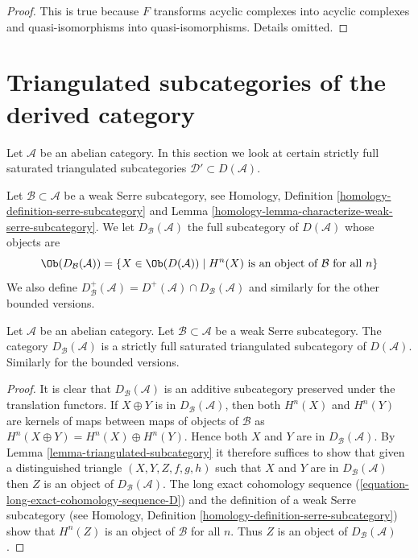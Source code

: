 \begin{proof}
This is true because $F$ transforms acyclic complexes into acyclic complexes
and quasi-isomorphisms into quasi-isomorphisms. Details omitted.
\end{proof}









\section{Triangulated subcategories of the derived category}
\label{section-triangulated-sub}

\noindent
Let $\mathcal{A}$ be an abelian category. In this section we look at
certain strictly full saturated triangulated subcategories
$\mathcal{D}' \subset D(\mathcal{A})$.

\medskip\noindent
Let $\mathcal{B} \subset \mathcal{A}$ be a weak Serre subcategory, see
Homology, Definition \ref{homology-definition-serre-subcategory} and
Lemma \ref{homology-lemma-characterize-weak-serre-subcategory}.
We let $D_\mathcal{B}(\mathcal{A})$ the full subcategory of
$D(\mathcal{A})$ whose objects are
$$
\Ob(D_\mathcal{B}(\mathcal{A}))
=
\{X \in \Ob(D(\mathcal{A})) \mid
H^n(X) \text{ is an object of }\mathcal{B}\text{ for all }n\}
$$
We also define
$D^{+}_\mathcal{B}(\mathcal{A}) =
D^{+}(\mathcal{A}) \cap D_\mathcal{B}(\mathcal{A})$
and similarly for the other bounded versions.

\begin{lemma}
\label{lemma-cohomology-in-serre-subcategory}
Let $\mathcal{A}$ be an abelian category.
Let $\mathcal{B} \subset \mathcal{A}$ be a weak Serre subcategory.
The category $D_\mathcal{B}(\mathcal{A})$ is a strictly full
saturated triangulated subcategory of $D(\mathcal{A})$.
Similarly for the bounded versions.
\end{lemma}

\begin{proof}
It is clear that $D_\mathcal{B}(\mathcal{A})$ is an additive subcategory
preserved under the translation functors.
If $X \oplus Y$ is in $D_\mathcal{B}(\mathcal{A})$, then
both $H^n(X)$ and $H^n(Y)$ are kernels of maps between maps of objects
of $\mathcal{B}$ as $H^n(X \oplus Y) = H^n(X) \oplus H^n(Y)$.
Hence both $X$ and $Y$ are in $D_\mathcal{B}(\mathcal{A})$. By
Lemma \ref{lemma-triangulated-subcategory}
it therefore suffices to show that given a distinguished triangle
$(X, Y, Z, f, g, h)$ such that $X$ and $Y$ are in $D_\mathcal{B}(\mathcal{A})$
then $Z$ is an object of $D_\mathcal{B}(\mathcal{A})$. The long exact
cohomology sequence (\ref{equation-long-exact-cohomology-sequence-D})
and the definition of a weak Serre subcategory (see
Homology, Definition \ref{homology-definition-serre-subcategory})
show that $H^n(Z)$ is an object of $\mathcal{B}$ for all $n$.
Thus $Z$ is an object of $D_\mathcal{B}(\mathcal{A})$.
\end{proof}

